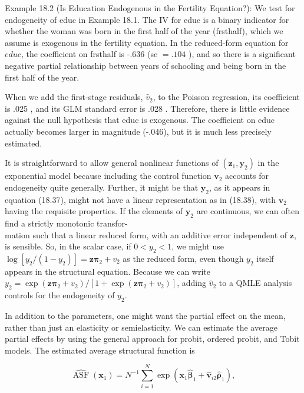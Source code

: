 \documentclass[10pt]{article}
\begin{document}
Example 18.2 (Is Education Endogenous in the Fertility Equation?): We test for endogeneity of educ in Example 18.1. The IV for educ is a binary indicator for whether the woman was born in the first half of the year (frsthalf), which we assume is exogenous in the fertility equation. In the reduced-form equation for $e d u c$, the coefficient on frsthalf is -.636 (se $=.104$ ), and so there is a significant negative partial relationship between years of schooling and being born in the first half of the year.

When we add the first-stage residuals, $\hat{v}_{2}$, to the Poisson regression, its coefficient is .025 , and its GLM standard error is .028 . Therefore, there is little evidence against the null hypothesis that educ is exogenous. The coefficient on educ actually becomes larger in magnitude (-.046), but it is much less precisely estimated.

It is straightforward to allow general nonlinear functions of $\left(\mathbf{z}_{1}, \mathbf{y}_{2}\right)$ in the exponential model because including the control function $\mathbf{v}_{2}$ accounts for endogeneity quite generally. Further, it might be that $\mathbf{y}_{2}$, as it appears in equation (18.37), might not have a linear representation as in (18.38), with $\mathbf{v}_{2}$ having the requisite properties. If the elements of $\mathbf{y}_{2}$ are continuous, we can often find a strictly monotonic transfor-\\
mation such that a linear reduced form, with an additive error independent of $\mathbf{z}$, is sensible. So, in the scalar case, if $0<y_{2}<1$, we might use $\log \left[y_{2} /\left(1-y_{2}\right)\right]= \mathbf{z} \boldsymbol{\pi}_{2}+v_{2}$ as the reduced form, even though $y_{2}$ itself appears in the structural equation. Because we can write $y_{2}=\exp \left(\mathbf{z} \boldsymbol{\pi}_{2}+v_{2}\right) /\left[1+\exp \left(\mathbf{z} \boldsymbol{\pi}_{2}+v_{2}\right)\right]$, adding $\hat{v}_{2}$ to a QMLE analysis controls for the endogeneity of $y_{2}$.

In addition to the parameters, one might want the partial effect on the mean, rather than just an elasticity or semielasticity. We can estimate the average partial effects by using the general approach for probit, ordered probit, and Tobit models. The estimated average structural function is


\begin{equation*}
\widehat{\operatorname{ASF}}\left(\mathbf{x}_{1}\right)=N^{-1} \sum_{i=1}^{N} \exp \left(\mathbf{x}_{1} \hat{\boldsymbol{\beta}}_{1}+\hat{\mathbf{v}}_{i 2} \hat{\boldsymbol{\rho}}_{1}\right), \tag{18.41}
\end{equation*}
\end{document}

